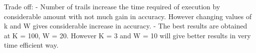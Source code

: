 \documentclass{article}
\begin{document}
\begin{enumerate}
\begin{figure}
			\hspace{15px}
			\hspace{15px}
		\end{figure}
		Trade off:\newline
		- Number of trails increase the time required of execution by considerable amount with not much gain in accuracy. However changing values of k and W gives considerable increase in accuracy.\newline
		- The best results are obtained at K = 100, W = 20. However K = 3 and W = 10 will give better results in very time efficient way.	\newline


\end{enumerate}
\end{document}
